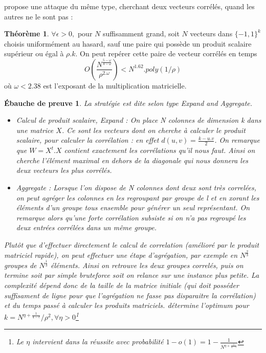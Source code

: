 \documentclass{article}		%
\theoremstyle{definition}
\newtheorem{theo}{Théorème}
\theoremstyle{plain}
\newtheorem{intui}{Ébauche de preuve}
\theoremstyle{plain}
\theoremstyle{plain}
\theoremstyle{plain}
\theoremstyle{plain}
\begin{document}
 \cite{Valiant} propose une attaque du même type, cherchant deux vecteurs
corrélés, quand les autres ne le sont pas :
\begin{framed}

\begin{theo}
$\forall \epsilon > 0,$ pour $N$ suffisamment grand, soit $N$
vecteurs dans $\{-1,1\}^k$ choisis uniformément au hasard, sauf une paire
qui possède un produit scalaire supérieur ou égal à $\rho.k$. On peut
repérer cette paire de vecteur corrélés en temps
$$O(\frac{N^{\frac{5-\omega}{4-\omega}}}{\rho^{2.\omega}})<N^{1.62}.poly(1/\rho)$$
où $\omega < 2.38$ est l'exposant de la multiplication matricielle.
\end{theo}
\begin{intui}
La stratégie est dite selon \cite{Valiant} type \emph{Expand and Aggregate}.

\begin{itemize}
\item \emph{Calcul de produit scalaire, Expand :} On place N colonnes de
dimension k dans une matrice $X$. Ce sont les vecteurs dont on cherche à
calculer le produit scalaire, pour calculer la corrélation : en effet
$d(u,v)=\frac{k-u.v}{2}$. On remarque que $W=X^t.X$ contient exactement
les corrélations qu'il nous faut. Ainsi on cherche l'élément maximal en
dehors de la diagonale qui nous donnera les deux vecteurs les plus
corrélés.
\item \emph{Aggregate :} Lorsque l'on dispose de N colonnes dont deux sont
très correlées, on peut agréger les colonnes en les regroupant par
groupe de l et en xorant les éléments d'un groupe tous ensemble pour
générer un  seul représentant. On remarque alors qu'une forte corrélation subsiste si on n'a pas
regroupé les deux entrées corrélées dans un même groupe. 
\end{itemize} 
Plutôt que d'effectuer directement le calcul de correlation (amélioré par
le produit matriciel rapide), on peut effectuer une étape d'agrégation,
par exemple en $N^{\frac{2}{3}}$ groupes de $N^{\frac{1}{3}}$ éléments.
Ainsi on retrouve les deux groupes correlés, puis on termine soit par simple
bruteforce soit on relance sur une instance plus petite.
La complexité dépend donc de la taille de la matrice
initiale (qui doit posséder suffisament de ligne pour que l'agrégation ne
fasse pas disparaitre la corrélation) et du temps passé à calculer les
produits matriciels. \cite{Valiant} détermine l'optimum pour
$k=N^{\eta+\frac{1}{4-\epsilon}}/\rho^2, \forall \eta>0$\footnote{Le $\eta$ intervient
dans la réussite avec probabilité
$1-o(1)=1-\frac{1}{N^{\eta+\frac{1}{4-\epsilon}}}$}
\end{intui}
\end{framed}
\end{document}
